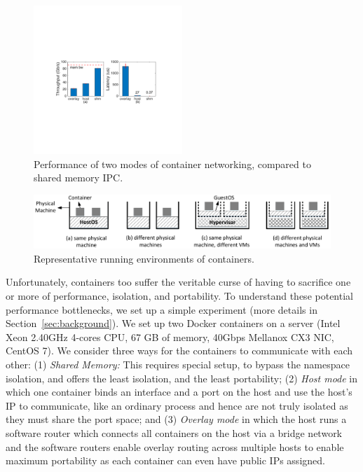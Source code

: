 \begin{figure}[th]
     \centering 
     \includegraphics[width=0.5\textwidth]{figures/intro/intro_exist2.pdf} 
     \caption{Performance of two modes of container networking, compared to
     shared memory IPC.} 
     \label{fig:three_modes} 
\end{figure} 
\begin{figure} [t]
	\centering   
	\includegraphics[width=6.7in]{figures/deployment-cases.pdf}   
	\caption{\label{fig:deploy-cases} Representative running environments of containers.}   
\end{figure}

Unfortunately, containers too suffer the veritable curse of having to sacrifice
one or more of performance, isolation, and portability.  To understand these
potential performance bottlenecks, we set up a simple experiment (more details
in Section~\ref{sec:background}).  We set up two Docker containers on a server
(Intel Xeon 2.40GHz 4-cores CPU, 67 GB of memory, 40Gbps Mellanox CX3 NIC,
CentOS 7). We consider three ways for the containers to communicate with each
other: (1) {\em Shared Memory:} This requires special setup, to bypass the
namespace isolation, and offers the least isolation, and the least portability;
(2) {\em Host  mode} in which one container binds an interface and a port on the
host and use the host's IP to communicate, like an ordinary process and hence
are not truly isolated as they must share the port space; and (3)  {\em Overlay
mode} in which the host runs a software router which connects all containers on
the host via  a bridge network and the software routers enable overlay routing
across multiple hosts to enable maximum portability as  each container can even
have public IPs assigned.

